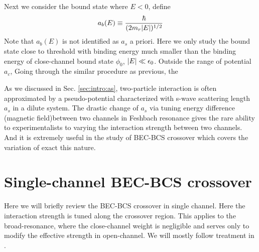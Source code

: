 Next we consider the bound state where $E<0$, define
\begin{equation}
a_{b}(E)\equiv\frac{\hbar}{(2m_{r}\lvert{E}\rvert)^{1/2}}
\end{equation}
Note that $a_{b}(E)$ is not identified as $a_{s}$ a priori.  Here we only study the bound state close to threshold with binding energy much smaller than the binding energy of close-channel bound state $\phi_{0}$, $\lvert{E}\rvert\ll\epsilon_{0}$.  Outside the range of potential $a_{c}$,  Going through the similar procedure as previous, the 









As we discussed in Sec. \ref{sec:intro:as}, two-particle interaction is often approximated by a pseudo-potential characterized with s-wave scattering length $a_{s}$ in a dilute system.   The drastic  change  of $a_{s}$  via tuning energy difference (magnetic field)between two channels in Feshbach resonance gives the rare ability to experimentalists to varying the interaction strength between two channels.  And it is extremely useful in the study of BEC-BCS crossover which covers the variation of exact this nature.  


\section{Single-channel BEC-BCS crossover}
Here we will briefly review the BEC-BCS crossover in single channel.   Here the interaction strength is tuned along the crossover region.  This applies to the broad-resonance, where the close-channel weight is negligible and serves only to modify the effective strength in open-channel.  We will mostly follow treatment in \cite{RanderiaBEC, Randeria1997, Randeria2008}.
